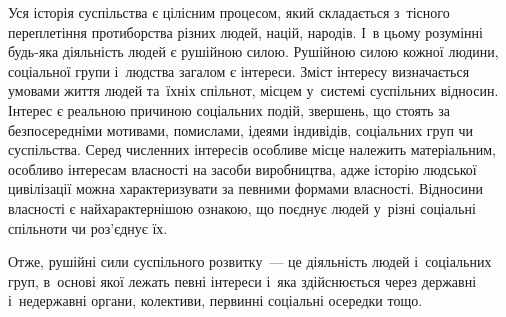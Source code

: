 \documentclass[a5paper,oneside,DIV=12,12pt,headings=small]{scrartcl}
\begin{document}
		Уся історія суспільства є цілісним процесом, який складається з~тісного переплетіння протиборства різних людей, націй, народів. І~в цьому розумінні будь-яка діяльність людей є рушійною силою. Рушійною силою кожної людини, соціальної групи і~людства загалом є інтереси. Зміст інтересу визначається умовами життя людей та~їхніх спільнот, місцем у~системі суспільних відносин. Інтерес є реальною причиною соціальних подій, звершень, що стоять за безпосередніми мотивами, помислами, ідеями індивідів, соціальних груп чи суспільства. Серед численних інтересів особливе місце належить матеріальним, особливо інтересам власності на засоби виробництва, адже історію людської цивілізації можна характеризувати за певними формами власності. Відносини власності є найхарактернішою ознакою, що поєднує людей у~різні соціальні спільноти чи роз'\-єд\-нує їх. 
		
		Отже, рушійні сили суспільного розвитку~— це діяльність людей і~соціальних груп, в~основі якої лежать певні інтереси і~яка здійснюється через державні і~недержавні органи, колективи, первинні соціальні осередки тощо. 

	
\end{document}
